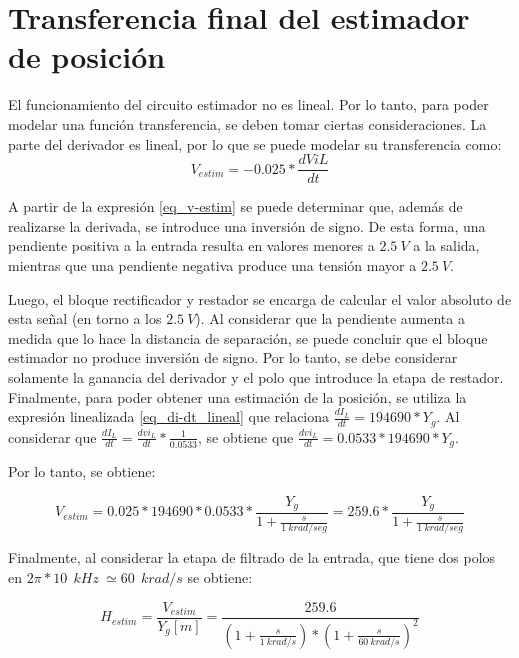 \section{Transferencia final del estimador de posici\'{o}n}

El funcionamiento del circuito estimador no es lineal.  Por lo tanto, para poder modelar una función transferencia, se deben tomar ciertas consideraciones. La parte del derivador es lineal, por lo que se puede modelar su transferencia como:
\begin{equation}\label{eq_v-estim}
	V_{estim}=-0.025*\frac{dViL}{dt} 
\end{equation}

A partir de la expresión \ref{eq_v-estim} se puede determinar que, además de realizarse la derivada, se introduce una inversión de signo. De esta forma, una pendiente positiva a la entrada resulta en valores menores a $2.5\:V$ a la salida, mientras que una pendiente negativa produce una tensión mayor a $2.5\:V$.

Luego, el bloque rectificador y restador se encarga de calcular el valor absoluto de esta señal (en torno a los $2.5\:V$). Al considerar que la pendiente aumenta a medida que lo hace la distancia de separación, se puede concluir que el bloque estimador no produce inversión de signo. Por lo tanto, se debe considerar solamente la ganancia del derivador y el polo que introduce la etapa de restador. Finalmente, para poder obtener una estimación de la posición, se utiliza la expresión linealizada \ref{eq_di-dt_lineal} que relaciona $\frac{dI_{L}}{dt} = 194690 * Y_{g}$. Al considerar que $\frac{dI_{L}}{dt} =\frac{dvi_{L}}{dt}*\frac{1}{0.0533}$, se obtiene que $\frac{dvi_{L}}{dt} = 0.0533*194690*Y_{g}$. 

Por lo tanto, se obtiene:

\begin{equation}
 V_{estim}=0.025*194690*0.0533 * \frac{Y_{g}}{1 + \frac{s}{1\:krad/seg}}=259.6*\frac{Y_{g}}{1 + \frac{s}{1\:krad/seg}}	
\end{equation}

\noindent Finalmente, al considerar la etapa de filtrado de la entrada, que tiene dos polos en $2\pi *10\: \:{kHz}\ \simeq 60\: \:{krad/s}$ se obtiene:

\begin{equation} \label{eq_TLC_deriv_7}
	H_{estim}=\frac{V_{estim}}{Y_{g}[m]}=\frac{259.6}{(1+\frac{s}{1\: krad/s})*{(1+\frac{s}{60\: krad/s})}^2}
\end{equation}
